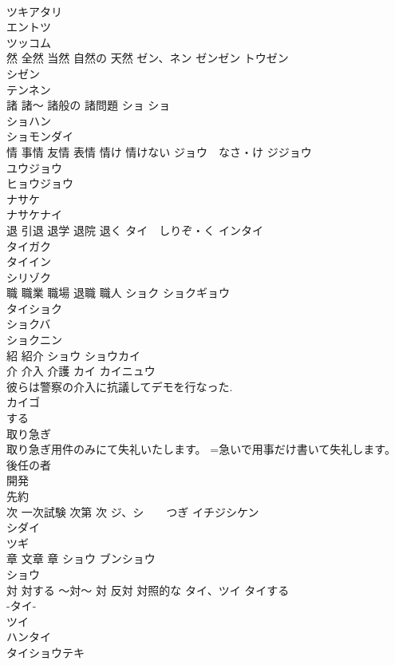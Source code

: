 \documentclass[8pt]{extreport}
\begin{document}
\begin{CJK}{UTF8}{min}
\\	ツキアタリ 
\\	エントツ 
\\	ツッコム 
\\	然 全然 当然 自然の 天然	ゼン、ネン ゼンゼン トウゼン 
\\	シゼン 
\\	テンネン 
\\	諸 諸〜 諸般の 諸問題	ショ ショ 
\\	ショハン 
\\	ショモンダイ 
\\	情 事情 友情 表情 情け 情けない	ジョウ　なさ・け ジジョウ 
\\	ユウジョウ 
\\	ヒョウジョウ 
\\	ナサケ 
\\	ナサケナイ 
\\	退 引退 退学 退院 退く	タイ　しりぞ・く インタイ 
\\	タイガク 
\\	タイイン 
\\	シリゾク 
\\	職 職業 職場 退職 職人	ショク ショクギョウ
\\	タイショク
\\	ショクバ 
\\	ショクニン 
\\	紹 紹介	ショウ ショウカイ 
\\	介 介入 介護	カイ カイニュウ 
\\	彼らは警察の介入に抗議してデモを行なった. 
\\	カイゴ 
\\	する 
\\	取り急ぎ	
\\	取り急ぎ用件のみにて失礼いたします。 =急いで用事だけ書いて失礼します。
\\	後任の者	
\\	開発	
\\	先約	
\\	次 一次試験 次第 次	ジ、シ　　つぎ イチジシケン 
\\	シダイ 
\\	ツギ 
\\	章 文章 章	ショウ ブンショウ 
\\	ショウ 
\\	対 対する 〜対〜 対 反対 対照的な	タイ、ツイ タイする 
\\	-タイ- 
\\	ツイ　
\\	ハンタイ 
\\	タイショウテキ 

\end{CJK}
\end{document}
